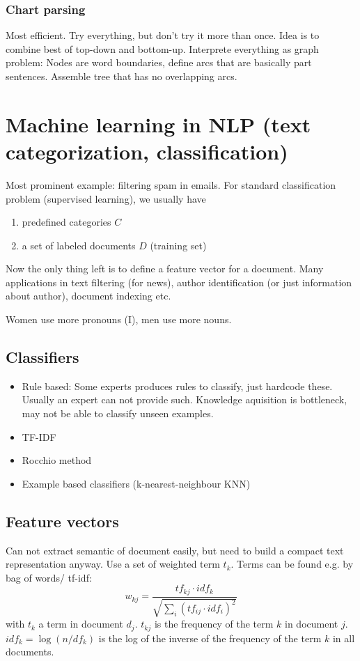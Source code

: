 \documentclass[11pt]{article}
\begin{document}
\subsubsection{Chart parsing}
Most efficient. Try everything, but don't try it more than once. Idea is to combine best 
of top-down and bottom-up. Interprete everything as graph problem: Nodes are word boundaries,
define arcs that are basically part sentences. Assemble tree that has no overlapping
arcs.

\section{Machine learning in NLP (text categorization, classification)}
Most prominent example: filtering spam in emails. For standard classification problem
(supervised learning), we usually have
\begin{enumerate}
	\item predefined categories $C$
	\item a set of labeled documents $D$ (training set)
\end{enumerate}
Now the only thing left is to define a feature vector for a document. Many applications 
in text filtering (for news), author identification (or just information about author),
document indexing etc.

Women use more pronouns (I), men use more nouns. 

\subsection{Classifiers}
\begin{itemize}
	\item Rule based: Some experts produces rules to classify, just hardcode these. Usually
	an expert can not provide such. Knowledge aquisition is bottleneck, may not be 
	able to classify unseen examples.
	\item TF-IDF
	\item Rocchio method
	\item Example based classifiers (k-nearest-neighbour KNN)
\end{itemize}
\subsection{Feature vectors}
Can not extract semantic of document easily, but need to build a compact text representation anyway. Use a set of weighted term $t_k$. Terms can be found e.g. by bag
of words/ tf-idf:
\begin{equation}
	w_{kj} = \frac{tf_{kj}\cdot idf_k}{\sqrt{\sum_i (tf_{ij}\cdot idf_i)^2}}
\end{equation}
with $t_k$ a term in document $d_j$. $t_{kj}$ is the frequency of the term $k$ in 
document $j$. $idf_k = \log(n/df_k)$ is the log of the
inverse of the frequency of the term $k$ in 
all documents. 
\end{document}
